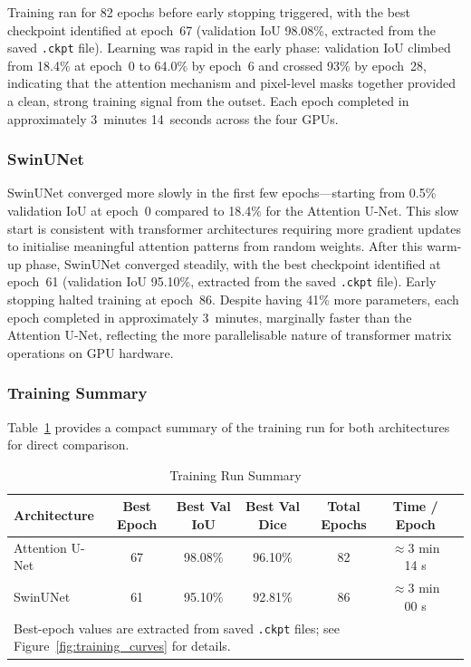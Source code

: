 \documentclass[a4paper,11pt]{article}
\begin{document}
Training ran for 82 epochs before early stopping triggered, with the best checkpoint
identified at epoch~67 (validation IoU 98.08\%, extracted from the saved
\texttt{.ckpt} file). Learning was rapid in the early phase: validation IoU climbed from
18.4\% at epoch~0 to 64.0\% by epoch~6 and crossed 93\% by epoch~28, indicating that
the attention mechanism and pixel-level masks together provided a clean, strong training
signal from the outset. Each epoch completed in approximately 3~minutes 14~seconds
across the four GPUs.

\subsubsection{SwinUNet}

SwinUNet converged more slowly in the first few epochs---starting from 0.5\% validation
IoU at epoch~0 compared to 18.4\% for the Attention U-Net. This slow start is consistent
with transformer architectures requiring more gradient updates to initialise meaningful
attention patterns from random weights. After this warm-up phase, SwinUNet converged
steadily, with the best checkpoint identified at epoch~61 (validation IoU 95.10\%,
extracted from the saved \texttt{.ckpt} file). Early stopping halted training at
epoch~86. Despite having 41\% more parameters, each epoch completed in approximately
3~minutes, marginally faster than the Attention U-Net, reflecting the more parallelisable
nature of transformer matrix operations on GPU hardware.

\subsubsection{Training Summary}

Table~\ref{tab:training_summary} provides a compact summary of the training run for both
architectures for direct comparison.

\begin{table}[H]
\centering
\caption{Training Run Summary}
\label{tab:training_summary}
\begin{tabular}{lcccccc}
\toprule
\textbf{Architecture} & \textbf{Best Epoch} & \textbf{Best Val IoU} & \textbf{Best Val Dice}
    & \textbf{Total Epochs} & \textbf{Time / Epoch} \\
\midrule
Attention U-Net & 67 & 98.08\% & 96.10\% & 82 & $\approx$3 min 14 s \\
SwinUNet        & 61 & 95.10\% & 92.81\% & 86 & $\approx$3 min 00 s \\
\bottomrule
\multicolumn{6}{l}{\footnotesize Best-epoch values are extracted from saved \texttt{.ckpt}
files; see Figure~\ref{fig:training_curves} for details.} \\
\end{tabular}
\end{table}
\end{document}
